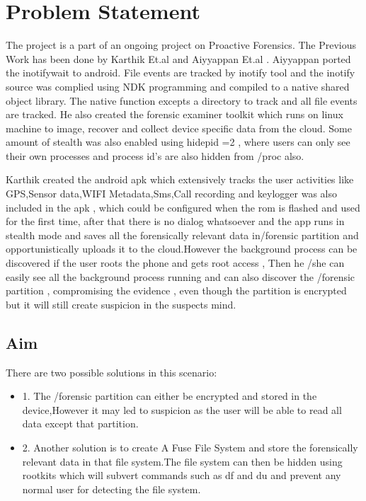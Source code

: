\chapter{Problem Statement}
\label{chap:problem statement}

The project is a part of an ongoing project on Proactive Forensics. The Previous Work has been done by Karthik Et.al \cite{Karthik2016} and  Aiyyappan Et.al \cite{Aiyyappan2015}. Aiyyappan ported the inotifywait to android. File events are tracked by inotify tool and the inotify source was complied using NDK programming and compiled to a native shared object library. The native function excepts a directory to track and all file events are tracked. He also created the forensic examiner toolkit which runs on linux machine to image, recover and collect device specific data from the cloud. Some amount of stealth was also enabled using hidepid =2 , where users can only see their own processes and process id's are also hidden from /proc also.

Karthik created the android apk which extensively tracks the user activities like GPS,Sensor data,WIFI Metadata,Sms,Call recording and keylogger was also included in the apk , which could be configured when the rom is flashed and used for the first time, after that there is no dialog whatsoever and the app runs in stealth mode and saves all the forensically relevant data in/forensic partition and opportunistically uploads it to the cloud.However the background process can be discovered if the user roots the phone and gets root access , Then he /she can easily see all the background process running and can also discover the /forensic partition , compromising the evidence , even though the partition is encrypted but it will still create suspicion in the suspects mind. 
\newpage
\section{Aim}
There are two possible solutions in this scenario:\\
\begin{itemize}
\item 1. The /forensic partition can either be encrypted and stored in the device,However it may led to suspicion as the user will be able to read all data except that partition.\\

\item 2. Another solution is to create A Fuse File System and store the forensically relevant data in that file system.The file system can then be hidden using rootkits which will subvert commands such as df and du and prevent any normal user for detecting the file system.

\end{itemize}
\bigskip

